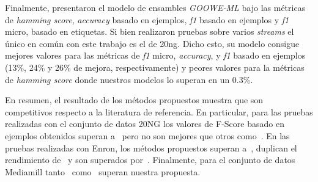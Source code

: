 Finalmente, \citeauthor{buyukcakir_novel_2018} presentaron el modelo de
ensambles \textit{GOOWE-ML} bajo las métricas de \textit{hamming score},
\textit{accuracy} basado en ejemplos, \textit{f1} basado en ejemplos y
\textit{f1} micro, basado en etiquetas. Si bien realizaron pruebas sobre varios
\textit{streams} el único en común con este trabajo es el de 20ng. Dicho esto,
su modelo consigue mejores valores para las métricas de \textit{f1} micro,
\textit{accuracy}, y \textit{f1} basado en ejemplos (13\%, 24\% y 26\% de
mejora, respectivamente) y peores valores para la métricas de \textit{hamming
	score} donde nuestros modelos lo superan en un 0.3\%.

En resumen, el resultado de los métodos propuestos muestra que son competitivos
respecto a la literatura de referencia. En particular, para las pruebas
realizadas con el conjunto de datos 20NG los valores de F-Score basado en
ejemplos obtenidos superan a~\cite{osojnik_multi-label_2017} pero no son mejores
que otros como~\cite{sousa_multi-label_2018, buyukcakir_novel_2018,
	roseberry_multi-label_2018}.  En las pruebas realizadas con Enron, los métodos
propuestos superan a~\cite{osojnik_multi-label_2017}, duplican el rendimiento
de~\cite{roseberry_multi-label_2018} y son superados
por~\cite{sousa_multi-label_2018}. Finalmente, para el conjunto de datos
Mediamill tanto~\cite{sousa_multi-label_2018}
como~\cite{roseberry_multi-label_2018} superan nuestra propuesta.



